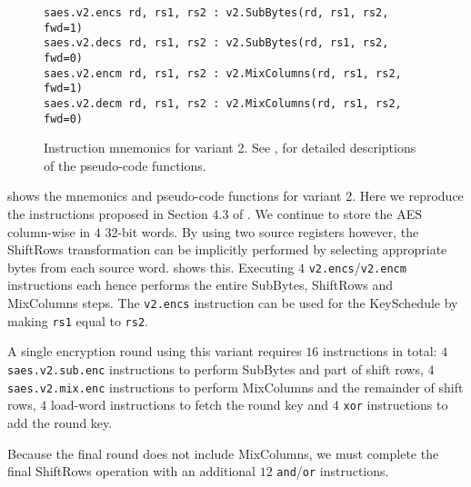 
\begin{figure}
\begin{lstlisting}[language=pseudo,style=block]
saes.v2.encs rd, rs1, rs2 : v2.SubBytes(rd, rs1, rs2, fwd=1)
saes.v2.decs rd, rs1, rs2 : v2.SubBytes(rd, rs1, rs2, fwd=0)
saes.v2.encm rd, rs1, rs2 : v2.MixColumns(rd, rs1, rs2, fwd=1)
saes.v2.decm rd, rs1, rs2 : v2.MixColumns(rd, rs1, rs2, fwd=0)
\end{lstlisting}
\caption{
    Instruction mnemonics for variant 2.
    See ,  for detailed
    descriptions of the pseudo-code functions.
}
\label{fig:mnemonics:v2}
\end{figure}

 shows the mnemonics and pseudo-code functions
for variant 2.
Here we reproduce the instructions proposed in Section $4.3$ of
\cite{TilGro:06}.
We continue to store the AES column-wise in $4$ $32$-bit words.
By using two source registers however,
the ShiftRows transformation can be implicitly performed by selecting
appropriate bytes from each source word.
shows this.
Executing $4$  {\tt v2.encs}/{\tt v2.encm} instructions each hence
performs the entire SubBytes, ShiftRows and MixColumns steps.
The {\tt v2.encs} instruction can be used for the KeySchedule by
making {\tt rs1} equal to {\tt rs2}.

A single encryption round using this variant requires $16$ instructions
in total:
$4$ {\tt saes.v2.sub.enc} instructions to perform SubBytes and part of
shift rows,
$4$ {\tt saes.v2.mix.enc} instructions to perform MixColumns and the
remainder of shift rows,
$4$ load-word instructions to fetch the round key
and
$4$ {\tt xor} instructions to add the round key.

Because the final round does not include MixColumns, we must
complete the final ShiftRows operation with an additional
$12$ {\tt and}/{\tt or} instructions.

